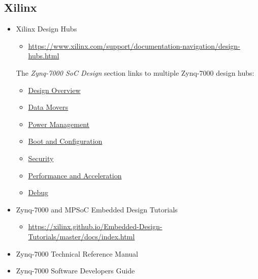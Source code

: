 \subsection{Xilinx}
%
\begin{itemize}
\item Xilinx Design Hubs
\begin{itemize}
\item \href{https://www.xilinx.com/support/documentation-navigation/design-hubs.html}
{https://www.xilinx.com/support/documentation-navigation/design-hubs.html}
\end{itemize}
%
The \emph{Zynq-7000 SoC Design} section links to multiple Zynq-7000 design hubs:
\begin{itemize}
\item \href{https://www.xilinx.com/support/documentation-navigation/design-hubs/dh0050-zynq-7000-design-overview-hub.html}{Design Overview}
\item \href{https://www.xilinx.com/support/documentation-navigation/design-hubs/dh0051-zynq-7000-data-movement-hub.html}{Data Movers}
\item \href{https://www.xilinx.com/support/documentation-navigation/design-hubs/dh0052-zynq-7000-power-management-hub.html}{Power Management}
\item \href{https://www.xilinx.com/support/documentation-navigation/design-hubs/dh0053-zynq-7000-boot-and-config-hub.html}{Boot and Configuration}
\item \href{https://www.xilinx.com/support/documentation-navigation/design-hubs/dh0056-zynq-7000-security-hub.html}{Security}
\item \href{https://www.xilinx.com/support/documentation-navigation/design-hubs/dh0054-zynq-7000-performance-and-benchmarks-hub.html}{Performance and Acceleration}
\item \href{https://www.xilinx.com/support/documentation-navigation/design-hubs/dh0055-zynq-7000-debug-hub.html}{Debug}
\end{itemize}
%
\item Zynq-7000 and MPSoC Embedded Design Tutorials
\begin{itemize}
\item \href{https://xilinx.github.io/Embedded-Design-Tutorials/master/docs/index.html}{https://xilinx.github.io/Embedded-Design-Tutorials/master/docs/index.html}
\end{itemize}
%
\item Zynq-7000 Technical Reference Manual~\cite{Xilinx_UG585_2021}
\item Zynq-7000 Software Developers Guide~\cite{Xilinx_UG821_2015}
\end{itemize}

